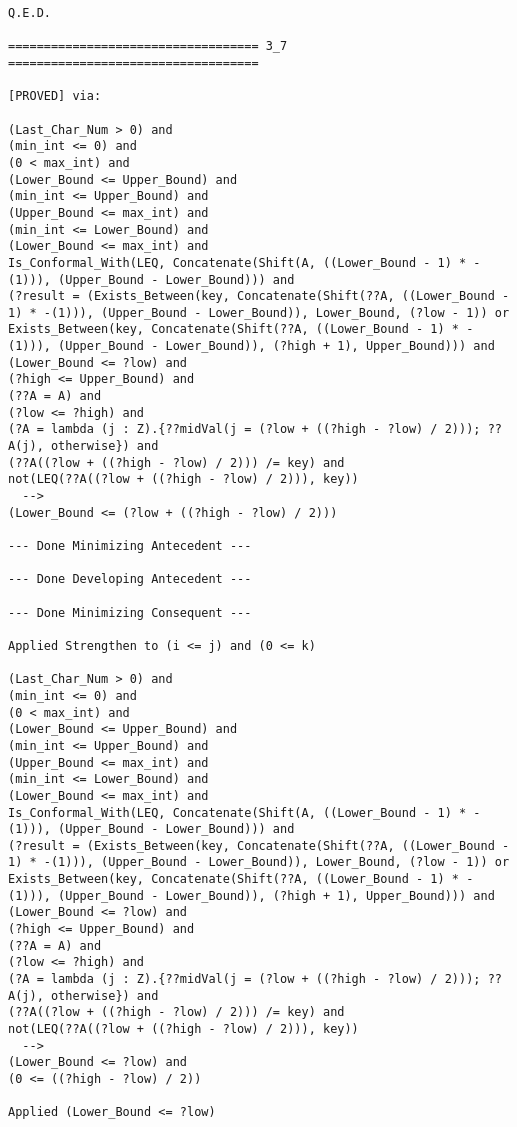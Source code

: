 \begin{lstlisting}[language=resolve]
Q.E.D.

=================================== 3_7 ===================================

[PROVED] via:

(Last_Char_Num > 0) and
(min_int <= 0) and
(0 < max_int) and
(Lower_Bound <= Upper_Bound) and
(min_int <= Upper_Bound) and
(Upper_Bound <= max_int) and
(min_int <= Lower_Bound) and
(Lower_Bound <= max_int) and
Is_Conformal_With(LEQ, Concatenate(Shift(A, ((Lower_Bound - 1) * -(1))), (Upper_Bound - Lower_Bound))) and
(?result = (Exists_Between(key, Concatenate(Shift(??A, ((Lower_Bound - 1) * -(1))), (Upper_Bound - Lower_Bound)), Lower_Bound, (?low - 1)) or Exists_Between(key, Concatenate(Shift(??A, ((Lower_Bound - 1) * -(1))), (Upper_Bound - Lower_Bound)), (?high + 1), Upper_Bound))) and
(Lower_Bound <= ?low) and
(?high <= Upper_Bound) and
(??A = A) and
(?low <= ?high) and
(?A = lambda (j : Z).{??midVal(j = (?low + ((?high - ?low) / 2))); ??A(j), otherwise}) and
(??A((?low + ((?high - ?low) / 2))) /= key) and
not(LEQ(??A((?low + ((?high - ?low) / 2))), key))
  -->
(Lower_Bound <= (?low + ((?high - ?low) / 2)))

--- Done Minimizing Antecedent ---

--- Done Developing Antecedent ---

--- Done Minimizing Consequent ---

Applied Strengthen to (i <= j) and (0 <= k)

(Last_Char_Num > 0) and
(min_int <= 0) and
(0 < max_int) and
(Lower_Bound <= Upper_Bound) and
(min_int <= Upper_Bound) and
(Upper_Bound <= max_int) and
(min_int <= Lower_Bound) and
(Lower_Bound <= max_int) and
Is_Conformal_With(LEQ, Concatenate(Shift(A, ((Lower_Bound - 1) * -(1))), (Upper_Bound - Lower_Bound))) and
(?result = (Exists_Between(key, Concatenate(Shift(??A, ((Lower_Bound - 1) * -(1))), (Upper_Bound - Lower_Bound)), Lower_Bound, (?low - 1)) or Exists_Between(key, Concatenate(Shift(??A, ((Lower_Bound - 1) * -(1))), (Upper_Bound - Lower_Bound)), (?high + 1), Upper_Bound))) and
(Lower_Bound <= ?low) and
(?high <= Upper_Bound) and
(??A = A) and
(?low <= ?high) and
(?A = lambda (j : Z).{??midVal(j = (?low + ((?high - ?low) / 2))); ??A(j), otherwise}) and
(??A((?low + ((?high - ?low) / 2))) /= key) and
not(LEQ(??A((?low + ((?high - ?low) / 2))), key))
  -->
(Lower_Bound <= ?low) and
(0 <= ((?high - ?low) / 2))

Applied (Lower_Bound <= ?low)


\end{lstlisting}
